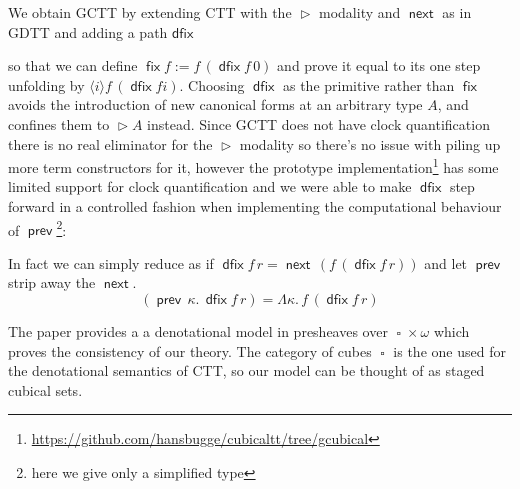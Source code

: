 \documentclass{book}
\DeclareMathOperator{\fix}{\mathsf{fix}}
\DeclareMathOperator{\Later}{\vartriangleright}
\DeclareMathOperator{\dfix}{\mathsf{dfix}}
\DeclareMathOperator{\prev}{\mathsf{prev}}
\DeclareMathOperator{\next}{\ensuremath{\mathsf{next}}}
\DeclareMathOperator{\Cube}{\square}
\newcommand{\sd}{.\,}
\begin{document}
  We obtain GCTT by extending CTT with the $\Later$ modality and $\next$ as in GDTT and adding a path $\mathsf{dfix}$
  so that we can define $\fix f := f\,(\dfix f\,0)$ and prove it
  equal to its one step unfolding by $\langle i \rangle f\,(\dfix f i)$.
  Choosing $\dfix$ as the primitive rather than $\fix$ avoids the
  introduction of new canonical forms at an arbitrary type $A$, and
  confines them to $\Later A$ instead.
  Since GCTT does not have clock quantification there is no real
  eliminator for the $\Later$ modality so there's no issue with piling
  up more term constructors for it, however the prototype
  implementation\footnote{\url{https://github.com/hansbugge/cubicaltt/tree/gcubical}} has some limited support for clock
  quantification and we were able to make $\dfix$ step forward in a
  controlled fashion when implementing the computational behaviour of
  $\prev$\footnote{here we give only a simplified type}:
  In fact we can simply reduce as if $\dfix f\,r = \next\,(f\,(\dfix f\,r))$ and let $\prev$ strip away the $\next$.
  \[
    (\prev\,\kappa\sd \dfix f\,r) = \Lambda \kappa\sd f\,(\dfix f\,r)
  \]

  The paper provides a a denotational model in presheaves over $\Cube
  \times \omega$ which proves the consistency of our theory.
  The category of cubes $\Cube$ is the one used for the denotational
  semantics of CTT, so our model can be thought of as staged cubical sets.
\end{document}
